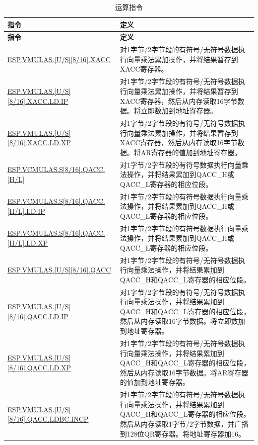 \begin{longtable}[c]{|l|m{9cm}|}
    \caption{运算指令}
    \label{tab:pie-mula-instructions}\\
    \hline
    \rowcolor{lightgray}
    \textbf{指令} & \textbf{定义} \\\hline
    \endfirsthead
    \rowcolor{lightgray}
    \textbf{指令} & \textbf{定义} \\\hline
    \endhead
    \endfoot

    \hyperref[instruction:ESPVMULASU8XACC]{ESP.VMULAS.[U/S][8/16].XACC} & 对1字节/2字节段的有符号/无符号数据执行向量乘法累加操作，并将结果暂存到XACC寄存器。 \\\hline
    \hyperref[instruction:ESPVMULASU8XACCLDIP]{ESP.VMULAS.[U/S][8/16].XACC.LD.IP} & 对1字节/2字节段的有符号/无符号数据执行向量乘法累加操作，并将结果暂存到XACC寄存器，然后从内存读取16字节数据。将立即数加到地址寄存器。 \\\hline
    \hyperref[instruction:ESPVMULASU8XACCLDXP]{ESP.VMULAS.[U/S][8/16].XACC.LD.XP} & 对1字节/2字节段的有符号/无符号数据执行向量乘法累加操作，并将结果暂存到XACC寄存器，然后从内存读取16字节数据。将AR寄存器的值加到地址寄存器。 \\\hline
    \hyperref[instruction:ESPVCMULASS8QACC_H]{ESP.VCMULAS.S[8/16].QACC.[H/L]} & 对1字节/2字节段的有符号数据执行向量乘法操作，并将结果累加到QACC\_H或QACC\_L寄存器的相应位段。 \\\hline
    \hyperref[instruction:ESPVCMULASS8QACC_HLDIP]{ESP.VCMULAS.S[8/16].QACC.[H/L].LD.IP} & 对1字节/2字节段的有符号数据执行向量乘法操作，并将结果累加到QACC\_H或QACC\_L寄存器的相应位段。 \\\hline
    \hyperref[instruction:ESPVCMULASS8QACC_HLDXP]{ESP.VCMULAS.S[8/16].QACC.[H/L].LD.XP} & 对1字节/2字节段的有符号数据执行向量乘法操作，并将结果累加到QACC\_H或QACC\_L寄存器的相应位段。 \\\hline
    \hyperref[instruction:ESPVMULASU8QACC]{ESP.VMULAS.[U/S][8/16].QACC} & 对1字节/2字节段的有符号/无符号数据执行向量乘法操作，并将结果累加到QACC\_H和QACC\_L寄存器的相应位段。 \\\hline
    \hyperref[instruction:ESPVMULASU8QACCLDIP]{ESP.VMULAS.[U/S][8/16].QACC.LD.IP} & 对1字节/2字节段的有符号/无符号数据执行向量乘法操作，并将结果累加到QACC\_H和QACC\_L寄存器的相应位段，然后从内存读取16字节数据。将立即数加到地址寄存器。 \\\hline
    \hyperref[instruction:ESPVMULASU8QACCLDXP]{ESP.VMULAS.[U/S][8/16].QACC.LD.XP} & 对1字节/2字节段的有符号/无符号数据执行向量乘法操作，并将结果累加到QACC\_H和QACC\_L寄存器的相应位段，然后从内存读取16字节数据。将AR寄存器的值加到地址寄存器。 \\\hline
    \hyperref[instruction:ESPVMULASU8QACCLDBCINCP]{ESP.VMULAS.[U/S][8/16].QACC.LDBC.INCP} & 对1字节/2字节段的有符号/无符号数据执行向量乘法操作，并将结果累加到QACC\_H和QACC\_L寄存器的相应位段。然后从内存读取1字节/2字节数据，并广播到128位QR寄存器。将地址寄存器加16。 \\\hline

\end{longtable}
